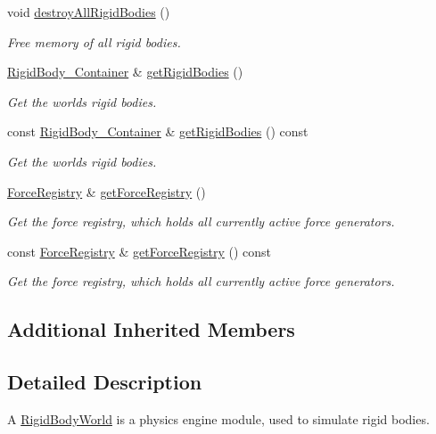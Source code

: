 \begin{DoxyCompactItemize}
void \mbox{\hyperlink{classr3_1_1_rigid_body_world_acdfd6a392a98366cd8414f7f6f50917f}{destroy\+All\+Rigid\+Bodies}} ()
\begin{DoxyCompactList}\small\item\em Free memory of all rigid bodies. \end{DoxyCompactList}\item 
\mbox{\hyperlink{classr3_1_1_rigid_body_world_abe8c123eee198b6f8eca079e71302bcb}{Rigid\+Body\+\_\+\+Container}} \& \mbox{\hyperlink{classr3_1_1_rigid_body_world_a31e9a0ddd26c25327aa21b3460c52893}{get\+Rigid\+Bodies}} ()
\begin{DoxyCompactList}\small\item\em Get the world\textquotesingle{}s rigid bodies. \end{DoxyCompactList}\item 
const \mbox{\hyperlink{classr3_1_1_rigid_body_world_abe8c123eee198b6f8eca079e71302bcb}{Rigid\+Body\+\_\+\+Container}} \& \mbox{\hyperlink{classr3_1_1_rigid_body_world_abf3bfd4b5d7ed2e843362e555b9eebb2}{get\+Rigid\+Bodies}} () const
\begin{DoxyCompactList}\small\item\em Get the world\textquotesingle{}s rigid bodies. \end{DoxyCompactList}\item 
\mbox{\hyperlink{classr3_1_1_force_registry}{Force\+Registry}} \& \mbox{\hyperlink{classr3_1_1_rigid_body_world_acfdc56e2796e5e0d86dbf71582e1b8c2}{get\+Force\+Registry}} ()
\begin{DoxyCompactList}\small\item\em Get the force registry, which holds all currently active force generators. \end{DoxyCompactList}\item 
const \mbox{\hyperlink{classr3_1_1_force_registry}{Force\+Registry}} \& \mbox{\hyperlink{classr3_1_1_rigid_body_world_a5ec345de8bdc6e910797434de918dbc2}{get\+Force\+Registry}} () const
\begin{DoxyCompactList}\small\item\em Get the force registry, which holds all currently active force generators. \end{DoxyCompactList}\end{DoxyCompactItemize}
\subsection*{Additional Inherited Members}


\subsection{Detailed Description}
A \mbox{\hyperlink{classr3_1_1_rigid_body_world}{Rigid\+Body\+World}} is a physics engine module, used to simulate rigid bodies. 

